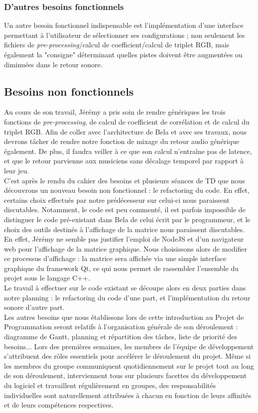 \subsubsection{D'autres besoins fonctionnels}
Un autre besoin fonctionnel indispensable est l'implémentation d'une
interface permettant à l'utilisateur de sélectionner ses
configurations ; non seulement les fichiers de
\textit{pre-processing}/calcul de coefficient/calcul de triplet RGB,
mais également la "consigne" déterminant quelles pistes doivent être
augmentées ou diminuées dans le retour sonore. \\

\subsection{Besoins non fonctionnels}
Au cours de son travail, Jérémy a pris soin de rendre génériques les
trois fonctions de \textit{pre-processing}, de calcul de coefficient
de corrélation et de calcul du triplet RGB. Afin de coller avec
l'architecture de Bela et avec ses travaux, nous devrons tâcher de
rendre notre fonction de mixage du retour audio générique
également. De plus, il faudra veiller à ce que son calcul n'entraîne
pas de latence, et que le retour parvienne aux musiciens sans décalage
temporel par rapport à leur jeu. \\ C'est après le rendu du cahier des
besoins et plusieurs séances de TD que nous découvrons un nouveau
besoin non fonctionnel : le refactoring du code. En effet, certains
choix effectués par notre prédécesseur sur celui-ci nous paraissent
discutables. Notamment, le code est peu commenté, il est parfois
impossible de distinguer le code pré-existant dans Bela de celui écrit
par le programmeur, et le choix des outils destinés à l'affichage de
la matrice nous paraissent discutables. En effet, Jérémy ne semble pas
justifier l'emploi de NodeJS et d'un navigateur web pour l'affichage
de la matrice graphique. Nous choisissons alors de modifier ce
processus d'affichage : la matrice sera affichée via une simple
interface graphique du framework Qt, ce qui nous permet de rassembler
l'ensemble du projet sous le langage C++. \\ Le travail à effectuer
sur le code existant se découpe alors en deux parties dans notre
planning : le refactoring du code d'une part, et l'implémentation du
retour sonore d'autre part. \\
Les autres besoins que nous établissons lors de cette introduction au
Projet de Programmation seront relatifs à l'organisation générale de
son déroulement : diagramme de Gantt, planning et répartition des
tâches, liste de priorité des besoins... Lors des premières semaines,
les membres de l'équipe de développement s'attribuent des rôles
essentiels pour accélérer le déroulement du projet. Même si les
membres du groupe communiquent quotidiennement sur le projet tout au
long de son déroulement, interviennent tous sur plusieurs facettes du
développement du logiciel et travaillent régulièrement en groupes, des
responsabilités individuelles sont naturellement attribuées à chacun
en fonction de leurs affinités et de leurs compétences respectives.


